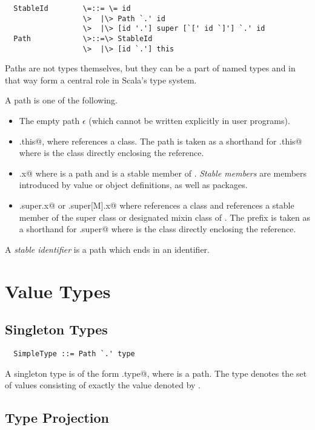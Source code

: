 \documentclass[11pt]{report}
\begin{document}
\syntax\begin{verbatim}
  StableId        \=::= \= id
                  \>  |\> Path `.' id 
                  \>  |\> [id '.'] super [`[' id `]'] `.' id
  Path            \>::=\> StableId
                  \>  |\> [id `.'] this
\end{verbatim}

Paths are not types themselves, but they can be a part of named types
and in that way form a central role in Scala's type system.

A path is one of the following.
\begin{itemize}
\item
The empty path $\epsilon$ (which cannot be written explicitly in user programs).
\item
\verb@C.this@, where \verb@C@ references a class. 
The path \verb@this@ is taken as a shorthand for \verb@C.this@ where 
\verb@C@ is the class directly enclosing the reference. 
\item
\verb@p.x@ where \verb@p@ is a path and \verb@x@ is a stable member of \verb@p@.
{\em Stable members} are members introduced by value or object
definitions, as well as packages.
\item
\verb@C.super.x@ or \verb@C.super[M].x@
where \verb@C@ references a class and \verb@x@ references a 
stable member of the super class or designated mixin class \verb@M@ of \verb@C@. 
The prefix \verb@super@ is taken as a shorthand for \verb@C.super@ where 
\verb@C@ is the class directly enclosing the reference. 
\end{itemize}
A {\em stable identifier} is a path which ends in an identifier.

\section{Value Types}

\subsection{Singleton Types}
\label{sec:singleton-type}

\syntax\begin{verbatim}
  SimpleType ::= Path `.' type
\end{verbatim}

A singleton type is of the form \verb@p.type@, where \verb@p@ is a
path.  The type denotes the set of values consisting of
exactly the value denoted by \verb@p@.

\subsection{Type Projection}
\label{sec:type-project}
\end{document}
